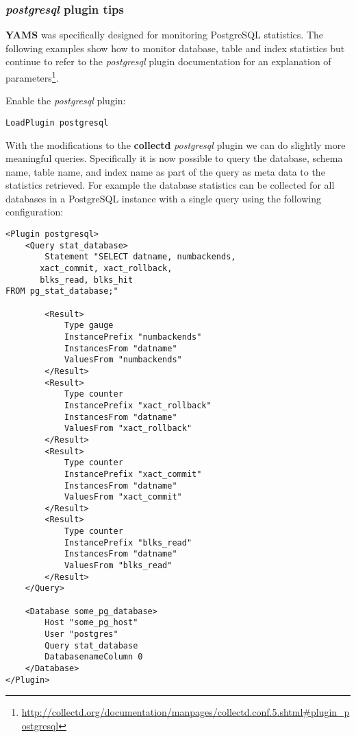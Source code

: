 \documentclass[a4paper,twoside,12pt]{article}
\begin{document}
\subsubsection{\textit{postgresql} plugin tips}

\textbf{YAMS} was specifically designed for monitoring PostgreSQL statistics.
The following examples show how to monitor database, table and index
statistics but continue to refer to the \textit{postgresql} plugin
documentation for an explanation of
parameters\footnote{\url{http://collectd.org/documentation/manpages/collectd.conf.5.shtml#plugin_postgresql}}.

Enable the \textit{postgresql} plugin:
\lstset{language=xml}
\begin{lstlisting}
LoadPlugin postgresql
\end{lstlisting}

With the modifications to the \textbf{collectd} \textit{postgresql} plugin we
can do slightly more meaningful queries.  Specifically it is now possible to
query the database, schema name, table name, and index name as part of the
query as meta data to the statistics retrieved.  For example the database
statistics can be collected for all databases in a PostgreSQL instance with a
single query using the following configuration:
\lstset{language=xml}
\begin{lstlisting}
<Plugin postgresql>
    <Query stat_database>
        Statement "SELECT datname, numbackends,
       xact_commit, xact_rollback,
       blks_read, blks_hit
FROM pg_stat_database;"

        <Result>
            Type gauge
            InstancePrefix "numbackends"
            InstancesFrom "datname"
            ValuesFrom "numbackends"
        </Result>
        <Result>
            Type counter
            InstancePrefix "xact_rollback"
            InstancesFrom "datname"
            ValuesFrom "xact_rollback"
        </Result>
        <Result>
            Type counter
            InstancePrefix "xact_commit"
            InstancesFrom "datname"
            ValuesFrom "xact_commit"
        </Result>
        <Result>
            Type counter
            InstancePrefix "blks_read"
            InstancesFrom "datname"
            ValuesFrom "blks_read"
        </Result>
    </Query>

    <Database some_pg_database>
        Host "some_pg_host"
        User "postgres"
        Query stat_database
        DatabasenameColumn 0
    </Database>
</Plugin>
\end{lstlisting}
\end{document}
